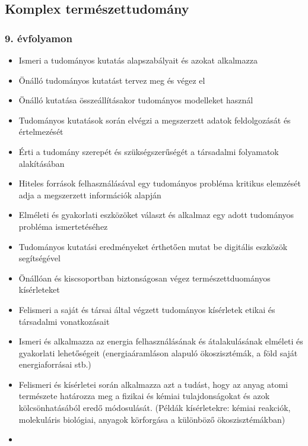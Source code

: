 \hypertarget{komplex-termeszettudomany}{%
\subsection{Komplex természettudomány}\label{komplex-termeszettudomany}}

\hypertarget{evfolyamon-3}{%
\subsubsection{9. évfolyamon}\label{evfolyamon-3}}

\begin{itemize}
\tightlist
\item
  Ismeri a tudományos kutatás alapszabályait és azokat alkalmazza
\item
  Önálló tudományos kutatást tervez meg és végez el
\item
  Önálló kutatása összeállításakor tudományos modelleket használ
\item
  Tudományos kutatások során elvégzi a megszerzett adatok feldolgozását
  és értelmezését
\item
  Érti a tudomány szerepét és szükségszerűségét a társadalmi folyamatok
  alakításában
\item
  Hiteles források felhasználásával egy tudományos probléma kritikus
  elemzését adja a megszerzett információk alapján
\item
  Elméleti és gyakorlati eszközöket választ és alkalmaz egy adott
  tudományos probléma ismertetéséhez
\item
  Tudományos kutatási eredményeket érthetően mutat be digitális eszközök
  segítségével
\item
  Önállóan és kiscsoportban biztonságosan végez természettduományos
  kísérleteket
\item
  Felismeri a saját és társai által végzett tudományos kísérletek etikai
  és társadalmi vonatkozásait
\item
  Ismeri és alkalmazza az energia felhasználásának és átalakulásának
  elméleti és gyakorlati lehetőségeit (energiaáramláson alapuló
  ökoszisztémák, a föld saját energiaforrásai stb.)
\item
  Felismeri és kísérletei során alkalmazza azt a tudást, hogy az anyag
  atomi természete határozza meg a fizikai és kémiai tulajdonságokat és
  azok kölcsönhatásából eredő módosulását. (Példák kísérletekre: kémiai
  reakciók, molekuláris biológiai, anyagok körforgása a különböző
  ökoszisztémákban)
\item

\end{itemize}

